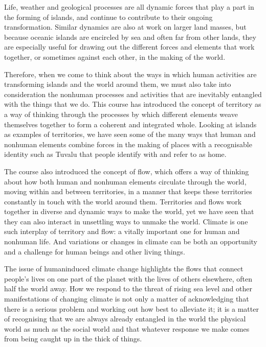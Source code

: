 \documentclass[letterpaper,10pt,english]{sphinxmanual}
\begin{document}
Life, weather and geological processes are all dynamic forces that play a part in the forming of islands, and continue to contribute to their ongoing transformation. Similar dynamics are also at work on larger land masses, but because oceanic islands are encircled by sea and often far from other lands, they are especially useful for drawing out the different forces and elements that work together, or sometimes against each other, in the making of the world.

Therefore, when we come to think about the ways in which human activities are transforming islands and the world around them, we must also take into consideration the non\sphinxhyphen{}human processes and activities that are inevitably entangled with the things that we do. This course has introduced the concept of territory as a way of thinking through the processes by which different elements weave themselves together to form a coherent and integrated whole. Looking at islands as examples of territories, we
have seen some of the many ways that human and non\sphinxhyphen{}human elements combine forces in the making of places with a recognisable identity \textendash{} such as Tuvalu \textendash{} that people identify with and refer to as home.

The course also introduced the concept of flow, which offers a way of thinking about how both human and non\sphinxhyphen{}human elements circulate through the world, moving within and between territories, in a manner that keeps these territories constantly in touch with the world around them. Territories and flows work together in diverse and dynamic ways to make the world, yet we have seen that they can also interact in unsettling ways to unmake the world. Climate is one such interplay of territory and flow:
a vitally important one for human and non\sphinxhyphen{}human life. And variations or changes in climate can be both an opportunity and a challenge for human beings and other living things.

The issue of human\sphinxhyphen{}induced climate change highlights the flows that connect people’s lives on one part of the planet with the lives of others elsewhere, often half the world away. How we respond to the threat of rising sea level and other manifestations of changing climate is not only a matter of acknowledging that there is a serious problem and working out how best to alleviate it; it is a matter of recognising that we are always already entangled in the world \textendash{} the physical world as much as
the social world \textendash{} and that whatever response we make comes from being caught up in the thick of things.
\end{document}
